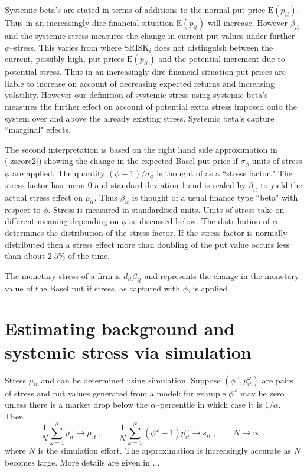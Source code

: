 \documentclass[authoryear]{elsarticle}
\newcommand{\E}{\mathrm{E}}
\renewcommand{\o}{\omega}
\newcommand{\eref}[1]{(\ref{#1})}
\newcommand{\cq}{\ , \qquad}
\newcommand{\be}[1]{\begin{equation}\label{#1}}
\newcommand{\ee}{\end{equation}}
\begin{document}
Systemic beta's are stated in terms of additions to the normal put price $\E(p_{it})$. Thus in an increasingly dire financial situation $\E(p_{it})$ will increase.   However  $\beta_{it}$ and the systemic stress measures the  change in current put values  under  further $\phi$--stress.  This varies from  \cite{brownlees2015} where $\mathrm{SRISK}_i$ does not distinguish between the current, possibly high, put prices $\E(p_{it})$ and the potential  increment due to potential stress.   Thus in an increasingly dire financial situation put prices are liable to increase on account of decreasing expected returns and increasing volatility.   However our definition of systemic stress using systemic beta's measures the further effect on account of potential extra stress imposed onto the system over and above the already existing stress.   Systemic beta's capture   ``marginal" effects.  

The second interpretation is based on  the right hand side approximation in \eref{zscore2} showing   the change in the  expected Basel put price if  $\sigma_\phi$ units of stress $\phi$ are applied.  The quantity $(\phi-1)/\sigma_\phi$ is thought of as a ``stress factor."   The stress factor has mean 0 and standard deviation 1 and is scaled by $\beta_{it}$ to yield the actual stress effect on  $p_{it}$.  Thus  $\beta_{it}$ is thought of a usual finance type ``beta" with respect to $\phi$.   Stress is measured in standardised units.  Units of stress take on different meaning depending on  $\phi$ as discussed below. The distribution of $\phi$ determines the distribution of the stress factor. If the stress factor is normally distributed then a stress effect more than doubling of the put value  occurs less than about $2.5\%$ of the time. 

      

The  monetary stress of a firm is 
$
d_{it}\beta_{it}
$
and represents the change in the monetary value of the Basel put  if stress, as captured with $\phi$, is applied. 

\section{Estimating background and systemic stress via simulation}

Stress $\mu_{it}$ and can be determined using simulation.   Suppose $(\phi^\o,p_{it}^\o)$ are pairs of stress and put values generated from a model: for example $\phi^\o$ may be zero unless there is a market drop below the $\alpha$--percentile in which case it is $1/\alpha$. 
Then 
\be{simulate}
\frac{1}{N}\sum_{\o=1}^N p_{it}^\o\rightarrow \mu_{it}\cq \frac{1}{N}\sum_{\o=1}^N (\phi^\o-1)p_{it}^\o\rightarrow s_{it} \cq N\rightarrow\infty\ ,
\ee
where $N$ is the simulation effort.  The approximation is increasingly accurate as $N$ becomes large.   More details are given in ...
\end{document}
